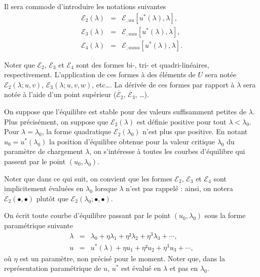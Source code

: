 \documentclass[12pt, final]{amsart}
\begin{document}
Il sera commode d'introduire les notations suivantes
\begin{eqnarray}
  \mathcal E_2(\lambda )&=&\mathcal E_{,uu}[u^*(\lambda ), \lambda ],\\
  \mathcal E_3(\lambda )&=&\mathcal E_{,uuu}[u^*(\lambda ), \lambda ],\\
  \mathcal E_4(\lambda )&=&\mathcal E_{,uuuu}[u^*(\lambda ), \lambda ].
\end{eqnarray}

Noter que \(\mathcal E_2\), \(\mathcal E_3\) et \(\mathcal E_4\) sont des formes bi-, tri- et quadri-linéaires,
respectivement. L'application de ces formes à des éléments de \(U\) sera notée
\(\mathcal E_2(\lambda ; u, v)\), \(\mathcal E_3(\lambda ; u, v, w)\), etc\dots. La dérivée de ces formes par
rapport à \(\lambda \) sera notée à l'aide d'un point supérieur (\(\dot{\mathcal E_2}\),
\(\dot{\mathcal E_3}\), \dots).

On suppose que l'équilibre est stable pour des valeurs suffisamment petites de
\(\lambda \). Plus précisément, on suppose que \(\mathcal E_2(\lambda )\) est définie positive pour tout
\(\lambda <\lambda _0\). Pour \(\lambda =\lambda _0\), la forme quadratique \(\mathcal E_2(\lambda _0)\) n'est plus que
positive. En notant \(u_0=u^*(\lambda _0)\) la position d'équilibre obtenue pour la
valeur critique \(\lambda _0\) du paramètre de chargement \(\lambda \), on s'intéresse à
toutes les courbes d'équilibre qui passent par le point \((u_0, \lambda _0)\).

Noter que dans ce qui suit, on convient que les formes \(\mathcal E_2\), \(\mathcal E_3\) et \(\mathcal E_4\)
sont implicitement évaluées en \(\lambda _0\) lorsque \(\lambda \) n'est pas rappelé : ainsi,
on notera \(\mathcal E_2(\bullet , \bullet )\) plutôt que \(\mathcal E_2(\lambda _0; \bullet , \bullet )\).

On écrit toute courbe d'équilibre passant par le point \((u_0, \lambda _0)\) sous la
forme paramétrique suivante
\begin{eqnarray}
  \label{eq:20211115075817}
  \lambda &=&\lambda _0+\eta \lambda _1+\eta ²\lambda _2+\eta ^3\lambda _3+\cdots,\\
  \label{eq:20211115075835}
  u&=&u^*(\lambda )+\eta u_1+\eta ²u_2+\eta ^3u_3+\cdots,
\end{eqnarray}
où \(\eta \) est un paramètre, non précisé pour le moment. Noter que, dans la
représentation paramétrique de \(u\), \(u^*\) est évalué en \(\lambda \) et pas en
\(\lambda _0\).
\end{document}
